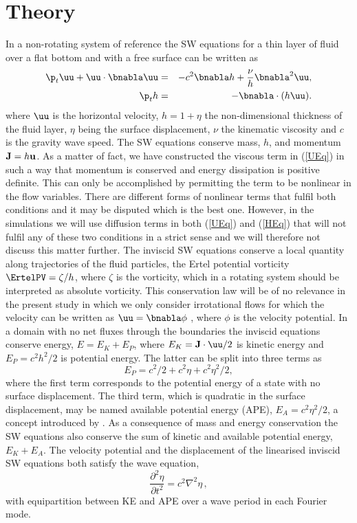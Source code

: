\section{Theory}

In a non-rotating system of reference the SW equations for a thin layer of fluid over a flat bottom and with a free
surface can be written as  \cite[see for example][]{VallisLIVRE2006}
\begin{eqnarray} \label{UEq}
\p_t \uu + \uu\cdot \bnabla  \uu   
&=& - c^2 \bnabla h + \frac{\nu}{h}  \bnabla^2 \uu,   \label{eq_uu}\\ \label{HEq}
\p_t   h    &=& - \bnabla \cdot (h \uu).  \label{eq_h}
\end{eqnarray}
where $\uu$ is the horizontal velocity, %
$h = 1 + \eta $ the non-dimensional thickness of the fluid layer,  $ \eta $ being the surface displacement, 
$\nu$ the kinematic viscosity and $ c $ is the gravity wave speed. The SW equations conserve mass, $ h $, and momentum $ {\bf J} = h{\bf u} $. As a matter of fact, we have constructed the viscous term in (\ref{UEq}) in such a way that momentum is conserved and energy dissipation is positive definite. This can only be accomplished by permitting the term to be nonlinear in the flow variables. There are different forms of nonlinear terms that fulfil both conditions and it may be disputed which is the best one. However, in the simulations we will use diffusion terms in both (\ref{UEq}) and (\ref{HEq}) that will not fulfil any of these two conditions in a strict sense and we will therefore not discuss this matter further. The inviscid SW equations conserve a local
quantity along trajectories of the fluid particles, the Ertel
potential vorticity $\ErtelPV = \zeta /h$, where $\zeta  $ is the vorticity, which in a rotating system should be interpreted as absolute vorticity.  This conservation law will be of no relevance in the present study in which we only consider
irrotational flows for which the velocity can be written as $ \uu = \bnabla \phi $ , where $ \phi $ is the velocity potential. In a domain with no net fluxes through the boundaries the inviscid equations conserve energy, $ E = E_K + E_P $, where $ E_K =   {\bf J}  \cdot {\uu} /2 $ is kinetic energy and $ E_P = c^{2} h^2/2 $ is potential energy. The latter can be split into three terms as \begin{equation}
E_P = c^2/2 + c^2\eta+ c^2 \eta^2/2, 
\end{equation}
where the first term corresponds to the potential energy of a state with no
surface displacement.  The third term, which is quadratic in the surface displacement, may be named available potential energy (APE),
$E_A = c^2\eta^2/2$, a concept introduced by  \cite{Lorenz1955}. As a consequence of mass and energy conservation the SW equations also conserve the sum of kinetic and available potential energy, $ E_K + E_A $.
 The velocity potential and the displacement of the linearised inviscid SW equations both satisfy the wave equation,
\begin{equation}
\frac{\partial ^2 \eta}{\partial t^2} = c^2 \nabla^2 \eta \, ,
\end{equation}
with equipartition between KE and APE over a wave period in each Fourier mode.

